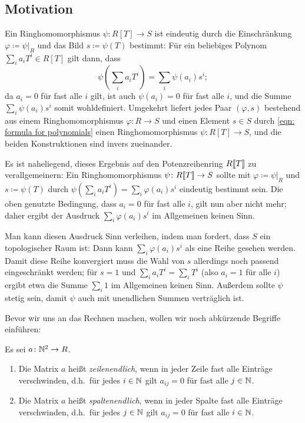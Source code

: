 \documentclass[a4paper, 10pt, numbers=noenddot]{scrartcl}
\begin{document}
\subsection*{Motivation}

Ein Ringhomomorphismus $\psi \colon R[T] \to S$ ist eindeutig durch die Einschränkung $\varphi \coloneqq \psi|_R$ und das Bild $s \coloneqq \psi(T)$ bestimmt:
Für ein beliebiges Polynom $\sum_i a_i T^i \in R[T]$ gilt dann, dass
\begin{equation}
  \label{eqn: formula for polynomials}
    \psi\left( \sum_i a_i T^i \right)
  = \sum_i \psi(a_i) s^i;
\end{equation}
da $a_i = 0$ für fast alle $i$ gilt, ist auch $\psi(a_i) = 0$ für fast alle $i$, und die Summe $\sum_i \psi(a_i) s^i$ somit wohldefiniert.
Umgekehrt liefert jedes Paar $(\varphi, s)$ bestehend aus einem Ringhomomorphismus $\varphi \colon R \to S$ und einen Element $s \in S$ durch \eqref{eqn: formula for polynomials} einen Ringhomomorphismus $\psi \colon R[T] \to S$, und die beiden Konstruktionen sind invers zueinander.

Es ist naheliegend, dieses Ergebnis auf den Potenzreihenring $R[\![T]\!]$ zu verallgemeinern:
Ein Ringhomomorphismus $\psi \colon R[\![T]\!] \to S$ sollte mit $\varphi \coloneqq \psi|_R$ und $s \coloneqq \psi(T)$ durch $\psi(\sum_i a_i T^i) = \sum_i \varphi(a_i) s^i$ eindeutig bestimmt sein.
Die oben genutzte Bedingung, dass $a_i = 0$ für fast alle $i$, gilt nun aber nicht mehr; daher ergibt der Ausdruck $\sum_i \varphi(a_i) s^i$ im Allgemeinen keinen Sinn.

Man kann diesen Ausdruck Sinn verleihen, indem man fordert, dass $S$ ein topologischer Raum ist:  
Dann kann $\sum_i \varphi(a_i) s^i$ als eine Reihe gesehen werden.
Damit diese Reihe konvergiert muss die Wahl von $s$ allerdings noch passend eingeschränkt werden;
für $s = 1$ und $\sum_i a_i T^i = \sum_i T^i$ (also $a_i = 1$ für alle $i$) ergibt etwa die Summe $\sum_i 1$ im Allgemeinen keinen Sinn.
Außerdem sollte $\psi$ stetig sein, damit $\psi$ auch mit unendlichen Summen verträglich ist.

Bevor wir uns an das Rechnen machen, wollen wir noch abkürzende Begriffe einführen:

\begin{definition}
  Es sei $a \colon \mathbb{N}^2 \to R$.
  \begin{enumerate}
    \item
      Die Matrix $a$ heißt \emph{zeilenendlich}, wenn in jeder Zeile fast alle Einträge verschwinden, d.h.\ für jedes $i \in \mathbb{N}$ gilt $a_{ij} = 0$ für fast alle $j \in \mathbb{N}$.
    \item
      Die Matrix $a$ heißt \emph{spaltenendlich}, wenn in jeder Spalte fast alle Einträge verschwinden, d.h.\ für jedes $j \in \mathbb{N}$ gilt $a_{ij} = 0$ für fast alle $i \in \mathbb{N}$.
  \end{enumerate}
\end{definition}
\end{document}
